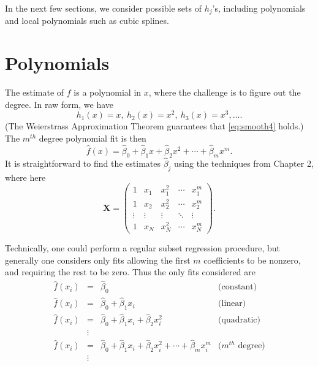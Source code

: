 \documentclass[
]{book}
\begin{document}
In the next few sections, we consider possible sets of \(h_j\)'s, including polynomials and local polynomials such as cubic splines.

\hypertarget{polynomials}{%
\section{Polynomials}\label{polynomials}}

The estimate of \(f\) is a polynomial in \(x\), where the challenge is to figure out the degree. In raw form, we have
\begin{equation}
h_1(x) = x,~h_2(x) = x^2,~h_3(x) = x^3, \ldots.
\label{eq:poly1}
\end{equation}
(The Weierstrass Approximation Theorem guarantees that \eqref{eq:smooth4} holds.)
The \(m^{th}\) degree polynomial fit is then
\begin{equation}
\widehat f(x) = 
\widehat\beta_0+ \widehat\beta_1x+\widehat\beta_2x^2+\cdots+\widehat\beta_mx^m.
\label{eq:poly2}
\end{equation}
It is straightforward to find the estimates \(\widehat\beta_j\) using the techniques from Chapter 2, where here
\begin{equation}
\mathbf{X} = \begin{pmatrix}
1&x_1&x_1^2&\cdots&x_1^m\\
1&x_2&x_2^2&\cdots&x_2^m\\
\vdots&\vdots&\vdots&\ddots&\vdots\\
1&x_N&x_N^2&\cdots&x_N^m
\end{pmatrix}.
\label{eq:poly3}
\end{equation}

Technically, one could perform a regular subset regression procedure, but generally one considers only fits allowing the
first \(m\) coefficients to be nonzero, and requiring the rest to be zero. Thus the only fits considered are
\begin{equation}
\begin{array}{rclc}
\widehat f(x_i) &=& \widehat{\beta}_0&\text{(constant)}\\
\widehat f(x_i) &=& \widehat\beta_0+ \widehat\beta_1x_i&\text{(linear)}\\
\widehat f(x_i) &=& \widehat\beta_0+ \widehat\beta_1x_i+ \widehat\beta_2x_i^2&\text{(quadratic)}\\
&\vdots&\\
\widehat f(x_i) &=& \widehat\beta_0+ \widehat\beta_1x_i+\widehat\beta_2x_i^2+\cdots+\widehat\beta_mx_i^m
&\text{($m^{th}$ degree)}\\
&\vdots&
\end{array}
\label{eq:poly4}
\end{equation}
\end{document}
